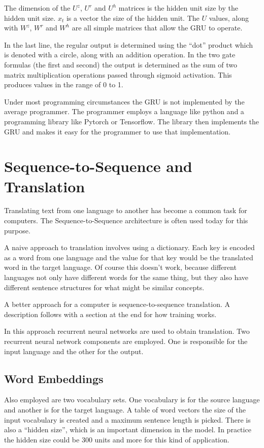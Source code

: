The dimension of the $U^z$, $U^r$ and $U^h$ matrices is the hidden unit size by the hidden unit size. $ x_t $ is a vector the size of the hidden unit. The $U$ values, along with $ W^z $, $ W^r $ and $ W^h $  are all simple matrices that allow the GRU to operate.

In the last line, the regular output is determined using the ``dot'' product which is denoted with a circle, along with an addition operation. In the two gate formulas (the first and second) the output is determined as the sum of two matrix multiplication operations passed through sigmoid activation. This produces values in the range of 0 to 1.

Under most programming circumstances the GRU is not implemented by the average programmer. The programmer employs a language like python and a programming library like Pytorch or Tensorflow. The library then implements the GRU and makes it easy for the programmer to use that implementation.

\section{Sequence-to-Sequence and Translation}

Translating text from one language to another has become a common task for computers. The Sequence-to-Sequence architecture is often used today for this purpose. 

A naive approach to translation involves using a dictionary. Each key is encoded as a word from one language and the value for that key would be the translated word in the target language. Of course this doesn't work, because different languages not only have different words for the same thing, but they also have different sentence structures for what might be similar concepts.

A better approach for a computer is sequence-to-sequence translation. A description follows with a section at the end for how training works.

In this approach recurrent neural networks are used to obtain translation. Two recurrent neural network components are employed. One is responsible for the input language and the other for the output. 


\subsection{Word Embeddings}

Also employed are two vocabulary sets. One vocabulary is for the source language and another is for the target language. A table of word vectors the size of the input vocabulary is created and a maximum sentence length is picked. There is also a ``hidden size'', which is an important dimension in the model. In practice the hidden size could be 300 units and more for this kind of application.

